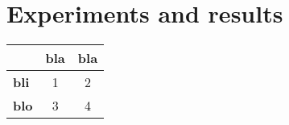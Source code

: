 \section*{Experiments and results}
\lipsum[2]
\begin{center}
	\begin{tabular}{lcc}
		\toprule
		& \textbf{bla} & \textbf{bla}\\
		\midrule
		\textbf{bli} & 1 & 2 \\
		\textbf{blo} & 3 & 4 \\
		\bottomrule
	\end{tabular}
\end{center}
